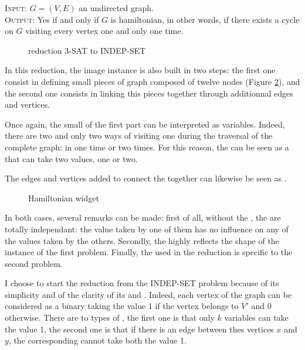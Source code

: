 \begin{definition} 
  \textsc{Input:} $G=(V,E)$ an undirected graph.\\
  \textsc{Output:} Yes if and only if $G$ is hamiltonian, in other
  words, if there exists a cycle on $G$ visiting every vertex one and
  only one time.\\
\end{definition}

\begin{figure}
  \centering
  
  \caption{reduction 3-SAT to INDEP-SET}
  \label{fig:indep-set}
\end{figure}

In this reduction, the image instance is also built in two steps: the
first one consist in defining small pieces of graph composed of twelve
nodes (Figure \ref{fig:hamilton}), and the second one consists in
linking this pieces together through additionnal edges and
vertices. 

Once again, the small \widgets of the first part can be interpreted as
variables. Indeed, there are two and only two ways of visiting one
\widget during the traversal of the complete graph: in one time or two
times. For this reason, the \widget can be seen as a \variable that
can take two values, one or two.

The edges and vertices added to connect the \widgets together can
likewise be seen as \constraints.

\begin{figure}
  \centering
  
  \caption{Hamiltonian widget}
  \label{fig:hamilton}
\end{figure}

In both cases, several remarks can be made: first of all, without the
\constraints, the \widgets are totally independant: the value taken by
one of them has no influence on any of the values taken by the
others. Secondly, the \constraints highly reflects the shape of
the instance of the first problem. Finally, the \widget used in the
reduction is specific to the second problem.

I choose to start the reduction from the INDEP-SET problem because
of its simplicity and of the clarity of its \constraints and
\variables. Indeed, each vertex of the graph can be considered as
a binary \variable taking the value 1 if the vertex belongs to $V'$
and 0 otherwise. There are to types of \constraints, the first one is
that only $k$ variables can take the value 1, the second one is that
if there is an edge between thes vertices $x$ and $y$, the
corresponding \variables cannot take both the value 1.

